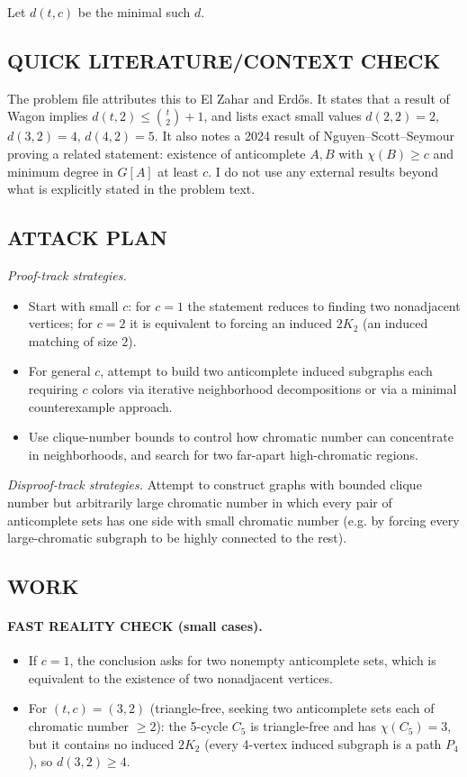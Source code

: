 Let $d(t,c)$ be the minimal such $d$.

\subsection*{QUICK LITERATURE/CONTEXT CHECK}
The problem file attributes this to El Zahar and Erd\H{o}s.
It states that a result of Wagon implies $d(t,2)\le \binom{t}{2}+1$, and lists exact small values $d(2,2)=2$, $d(3,2)=4$, $d(4,2)=5$.
It also notes a 2024 result of Nguyen--Scott--Seymour proving a related statement: existence of anticomplete $A,B$ with $\chi(B)\ge c$ and minimum degree in $G[A]$ at least $c$.
I do not use any external results beyond what is explicitly stated in the problem text.

\subsection*{ATTACK PLAN}
\emph{Proof-track strategies.}
\begin{itemize}
\item Start with small $c$: for $c=1$ the statement reduces to finding two nonadjacent vertices; for $c=2$ it is equivalent to forcing an induced $2K_2$ (an induced matching of size $2$).
\item For general $c$, attempt to build two anticomplete induced subgraphs each requiring $c$ colors via iterative neighborhood decompositions or via a minimal counterexample approach.
\item Use clique-number bounds to control how chromatic number can concentrate in neighborhoods, and search for two far-apart high-chromatic regions.
\end{itemize}

\emph{Disproof-track strategies.}
Attempt to construct graphs with bounded clique number but arbitrarily large chromatic number in which every pair of anticomplete sets has one side with small chromatic number (e.g. by forcing every large-chromatic subgraph to be highly connected to the rest).

\subsection*{WORK}
\paragraph{FAST REALITY CHECK (small cases).}
\begin{itemize}
\item If $c=1$, the conclusion asks for two nonempty anticomplete sets, which is equivalent to the existence of two nonadjacent vertices.
\item For $(t,c)=(3,2)$ (triangle-free, seeking two anticomplete sets each of chromatic number $\ge 2$): the 5-cycle $C_5$ is triangle-free and has $\chi(C_5)=3$, but it contains no induced $2K_2$ (every 4-vertex induced subgraph is a path $P_4$), so $d(3,2)\ge 4$.
\end{itemize}

